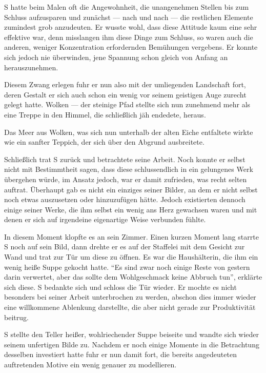 \documentclass{article}
\begin{document}
S hatte beim Malen oft die Angewohnheit, die unangenehmen Stellen bis zum Schluss aufzusparen und zunächst --- nach und nach --- die restlichen Elemente zumindest grob anzudeuten. Er wusste wohl, dass diese Attitude kaum eine sehr effektive war, denn misslangen ihm diese Dinge zum Schluss, so waren auch die anderen, weniger Konzentration erfordernden Bemühungen vergebens.
Er konnte sich jedoch nie überwinden, jene Spannung schon gleich von Anfang an herauszunehmen.

Diesem Zwang erlegen fuhr er nun also mit der umliegenden Landschaft fort, deren Gestalt er sich auch schon ein wenig vor seinem geistigen Auge zurecht gelegt hatte. Wolken --- der steinige Pfad stellte sich nun zunehmend mehr als eine Treppe in den Himmel, die schließlich jäh endedete, heraus.

Das Meer aus Wolken, was sich nun unterhalb der alten Eiche entfaltete wirkte wie ein sanfter Teppich, der sich über den Abgrund ausbreitete.

Schließlich trat S zurück und betrachtete seine Arbeit. Noch konnte er selbst nicht mit Bestimmtheit sagen, dass diese schlussendlich in ein gelungenes Werk übergehen würde, im Ansatz jedoch, war er damit zufrieden, was recht selten auftrat. Überhaupt gab es nicht ein einziges seiner Bilder, an dem er nicht selbst noch etwas auszusetzen oder hinzuzufügen hätte.
Jedoch existierten dennoch einige seiner Werke, die ihm selbst ein wenig ans Herz gewachsen waren und mit denen er sich auf irgendeine eigenartige Weise verbunden fühlte.

In diesem Moment klopfte es an sein Zimmer. Einen kurzen Moment lang starrte S noch auf sein Bild, dann drehte er es auf der Staffelei mit dem Gesicht zur Wand und trat zur Tür um diese zu öffnen. Es war die Haushälterin, die ihm ein wenig heiße Suppe gekocht hatte. ``Es sind zwar noch einige Reste von gestern darin verwertet, aber das sollte dem Wohlgeschmack keine Abbruch tun'', erklärte sich diese. S bedankte sich und schloss die Tür wieder. Er mochte es nicht besonders bei seiner Arbeit unterbrochen zu werden, abschon dies immer wieder eine willkommene Ablenkung darstellte, die aber nicht gerade zur Produktivität beitrug.

S stellte den Teller heißer, wohlriechender Suppe beiseite und wandte sich wieder seinem unfertigen Bilde zu. Nachdem er noch einige Momente in die Betrachtung desselben investiert hatte fuhr er nun damit fort, die bereits angedeuteten auftretenden Motive ein wenig genauer zu modellieren.
\end{document}
